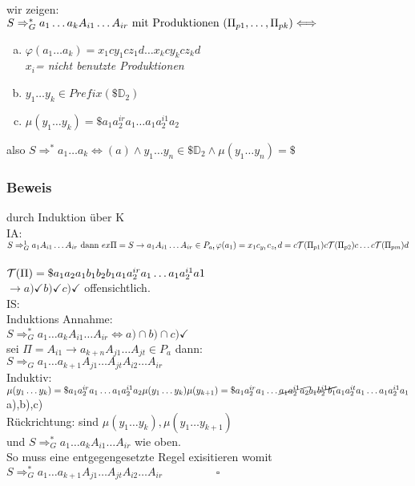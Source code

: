 	\\\\ wir zeigen:\\
	$S\Rightarrow_G^* a_1\dots a_kA_{i1}\dots A_{ir} \text{ mit Produktionen } (\Pi_{p1},\dots,\Pi_{pk})\\
	\Longleftrightarrow$\\
	\begin{enumerate}[(a)]
		\item $\varphi(a_1\dots a_k)=x_1cy_1cz_1d\dots x_kcy_kcz_kd$ \\\textit{$x_i$= nicht benutzte Produktionen}
		\item $y_1\dots y_k \in Prefix(\$\mathds{D}_2)$
		\item $\mu(y_1\dots y_k)= \$a_1a_2^{ir}a_1\dots a_1a_2^{i1}a_2$
	\end{enumerate}
	also $S\Rightarrow^* a_1\dots a_k \Leftrightarrow (a) \wedge y_1\dots y_n \in \$ \mathds{D}_2 \wedge \mu(y_1\dots y_n)=\$$
\subsubsection{Beweis}durch Induktion über K\\

		IA:\\$ S\Rightarrow_G^1 a_1A_{i1}\dots A_{ir} \text{ dann }\\
		ex \Pi =S \rightarrow a_1A_{i1}\dots A_{ir} \in P_{a_1} \\
		\varphi(a_1)=x_1c_{y_1}c_{z_1}d= c\mathcal{T}(\Pi_{p1})c\mathcal{T}(\Pi_{p2})c\dots c \mathcal{T}(\Pi_{pm})d$\\\\
		$\mathcal{T}(\Pi)=\$a_1a_2a_1b_1b_2b_1a_1a_2^{ir}a_1\dots a_1a_2^{i1}a1$\\
		$	\rightarrow a) \checkmark b) \checkmark c)\checkmark$ offensichtlich.\\
		IS:  \\
		Induktions Annahme:\\
		$S\Rightarrow_G^*a_1\dots a_k A_{i1}\dots A_{ir} \Leftrightarrow a)\cap b) \cap c) \checkmark$\\
		sei $\Pi = A_{i1} \rightarrow a_{k+n} A_{j1}\dots A_{jt} \in P_a$ dann:\\
		$S \Rightarrow_G a_1\dots a_{k+1} %
		A_{j1}\dots A_{jt}A_{i2}\dots A_{ir}$\\
		Induktiv:\\
		$\mu(y_1\dots y_k)=\$a_1a_2^{ir}a_1\dots a_1a_2^{i1}a_2\\
		\mu(y_1\dots y_k)\mu(y_{k+1})=\$a_1a_2^{ir}a_1\dots \cancel{a_1a_2^{i1}a_2} \cancel{b_1b_2^{i1}b_1}a_1a_2^{it}a_1\dots a_1a_2^{i1}a_1\\$
		a),b),c) \checkmark\\
		Rückrichtung: sind $\mu(y_1\dots y_k), \mu(y_1 \dots y_{k+1})$\\
		und $S\Rightarrow_G^* a_1\dots a_k A_{i1}\dots A_{ir}$ wie oben.\\
		So muss eine entgegengesetzte Regel exisitieren womit\\
		$S\Rightarrow_G^* a_1\dots a_{k+1}A_{j1}\dots A_{jt}A_{i2}\dots A_{ir}
		\hspace{2cm}\square$



